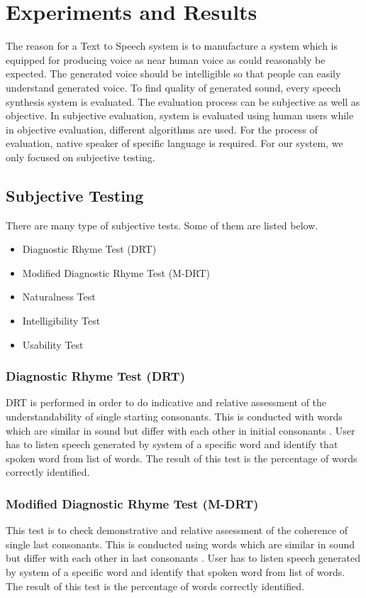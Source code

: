 \chapter{Experiments and Results}

The reason for a Text to Speech system is to manufacture a system which is equipped for producing voice as near human voice as could reasonably be expected. The generated voice should be intelligible so that people can easily understand generated voice. To find quality of generated sound, every speech synthesis system is evaluated. The evaluation process can be subjective as well as objective. In subjective evaluation, system is evaluated using human users while in objective evaluation, different algorithms are used. For the process of evaluation, native speaker of specific language is required. For our system, we only focused on subjective testing.

\section{Subjective Testing}

There are many type of subjective tests. Some of them are listed below.

\begin{itemize}
  \item Diagnostic Rhyme Test (DRT)
  \item Modified Diagnostic Rhyme Test (M-DRT)
  \item Naturalness Test
  \item Intelligibility Test
  \item Usability Test
\end{itemize}

\subsection{Diagnostic Rhyme Test (DRT)}
DRT is performed in order to do indicative and relative assessment of the understandability of single starting consonants. This is conducted with words which are similar in sound but differ with each other in initial consonants \cite{voiers1977diagnostic}. User has to listen speech generated by system of a specific word and identify that spoken word from list of words. The result of this test is the percentage of words correctly identified.

\subsection{Modified Diagnostic Rhyme Test (M-DRT)}
This test is to check demonstrative and relative assessment of the coherence of single last consonants. This is conducted using words which are similar in sound but differ with each other in last consonants \cite{house1965articulation}. User has to listen speech generated by system of a specific word and identify that spoken word from list of words. The result of this test is the percentage of words correctly identified.

